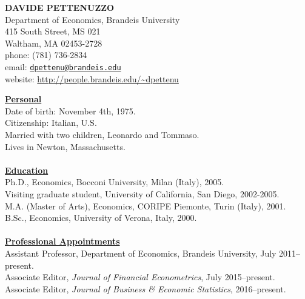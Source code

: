 \documentclass[12pt]{article}
\begin{document}
\begin{center}
\textbf{DAVIDE PETTENUZZO} \\
Department of Economics, Brandeis University \\
415 South Street, MS 021 \\
Waltham, MA 02453-2728 \\
phone: (781) 736-2834 \\
email: \href{mailto:dpettenu@brandeis.edu}{\nolinkurl{dpettenu@brandeis.edu}} \\
website: \url{http://people.brandeis.edu/~dpettenu} \\
\end{center}
\hline 
\bigskip

\underline{\textbf{Personal}}\\
Date of birth: November 4th, 1975. \\
Citizenship: Italian, U.S. \\
Married with two children, Leonardo and Tommaso. \\
Lives in Newton, Massachusetts. \\ \\ 
\underline{\textbf{Education}}\\
Ph.D., Economics, Bocconi University, Milan (Italy), 2005.\\
Visiting graduate student, University of California, San Diego, 2002-2005. \\
M.A. (Master of Arts), Economics, CORIPE Piemonte, Turin (Italy), 2001. \\
B.Sc., Economics, University of Verona, Italy, 2000.\\ \\
\underline{\textbf{Professional Appointments}}\\
Assistant Professor, Department of Economics, Brandeis University, July 2011--present.\\
Associate Editor, \textit{Journal of Financial Econometrics}, July 2015--present. \\
Associate Editor, \textit{Journal of Business \& Economic Statistics}, 2016--present.
\end{document}
